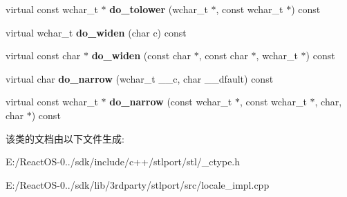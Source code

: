 \begin{DoxyCompactItemize}
virtual const wchar\+\_\+t $\ast$ {\bfseries do\+\_\+tolower} (wchar\+\_\+t $\ast$, const wchar\+\_\+t $\ast$) const
\item 
\mbox{\label{classctype_3_01wchar__t_01_4_ab77a0b02b6684f00cb815b842734b80c}} 
virtual wchar\+\_\+t {\bfseries do\+\_\+widen} (char c) const
\item 
\mbox{\label{classctype_3_01wchar__t_01_4_ab6b2c0ebbf32f41af430b84b840f54b0}} 
virtual const char $\ast$ {\bfseries do\+\_\+widen} (const char $\ast$, const char $\ast$, wchar\+\_\+t $\ast$) const
\item 
\mbox{\label{classctype_3_01wchar__t_01_4_a15250e27b53f76751da9bb1f485bf80a}} 
virtual char {\bfseries do\+\_\+narrow} (wchar\+\_\+t \+\_\+\+\_\+c, char \+\_\+\+\_\+dfault) const
\item 
\mbox{\label{classctype_3_01wchar__t_01_4_ab2dc4aaeb657c087b10af69b4862dcd8}} 
virtual const wchar\+\_\+t $\ast$ {\bfseries do\+\_\+narrow} (const wchar\+\_\+t $\ast$, const wchar\+\_\+t $\ast$, char, char $\ast$) const
\end{DoxyCompactItemize}


该类的文档由以下文件生成\+:\begin{DoxyCompactItemize}
\item 
E\+:/\+React\+O\+S-\/0../sdk/include/c++/stlport/stl/\+\_\+ctype.\+h\item 
E\+:/\+React\+O\+S-\/0../sdk/lib/3rdparty/stlport/src/locale\+\_\+impl.\+cpp\end{DoxyCompactItemize}
